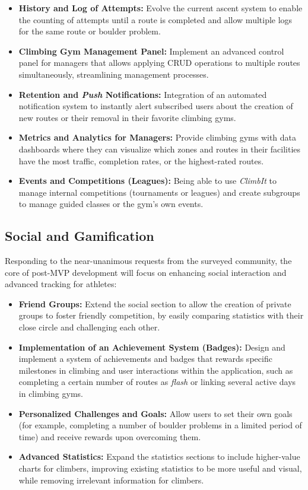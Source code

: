 \begin{itemize}
\item \textbf{History and Log of Attempts:} Evolve the current ascent system to enable the counting of attempts until a route is completed and allow multiple logs for the same route or boulder problem. \item \textbf{Climbing Gym Management Panel:} Implement an advanced control panel for managers that allows applying CRUD operations to multiple routes simultaneously, streamlining management processes. \item \textbf{Retention and \textit{Push} Notifications:} Integration of an automated notification system to instantly alert subscribed users about the creation of new routes or their removal in their favorite climbing gyms. \item \textbf{Metrics and Analytics for Managers:} Provide climbing gyms with data dashboards where they can visualize which zones and routes in their facilities have the most traffic, completion rates, or the highest-rated routes. \item \textbf{Events and Competitions (Leagues):} Being able to use \textit{ClimbIt} to manage internal competitions (tournaments or leagues) and create subgroups to manage guided classes or the gym's own events. 
\end{itemize}

\subsection{Social and Gamification} Responding to the near-unanimous requests from the surveyed community, the core of post-MVP development will focus on enhancing social interaction and advanced tracking for athletes: 

\begin{itemize}
\item \textbf{Friend Groups:} Extend the social section to allow the creation of private groups to foster friendly competition, by easily comparing statistics with their close circle and challenging each other. \item \textbf{Implementation of an Achievement System (Badges):} Design and implement a system of achievements and badges that rewards specific milestones in climbing and user interactions within the application, such as completing a certain number of routes as \textit{flash} or linking several active days in climbing gyms. \item \textbf{Personalized Challenges and Goals:} Allow users to set their own goals (for example, completing a number of boulder problems in a limited period of time) and receive rewards upon overcoming them. \item \textbf{Advanced Statistics:} Expand the statistics sections to include higher-value charts for climbers, improving existing statistics to be more useful and visual, while removing irrelevant information for climbers. 
\end{itemize}

